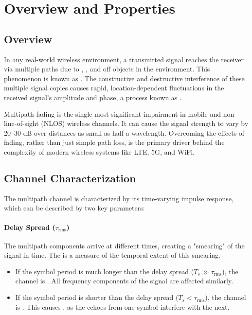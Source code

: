 \section{Overview and Properties}

\subsection{Overview}

In any real-world wireless environment, a transmitted signal reaches the receiver via multiple paths due to , , and  off objects in the environment. This phenomenon is known as . The constructive and destructive interference of these multiple signal copies causes rapid, location-dependent fluctuations in the received signal's amplitude and phase, a process known as .

\begin{keyconcept}
    Multipath fading is the single most significant impairment in mobile and non-line-of-sight (NLOS) wireless channels. It can cause the signal strength to vary by 20--30 dB over distances as small as half a wavelength. Overcoming the effects of fading, rather than just simple path loss, is the primary driver behind the complexity of modern wireless systems like LTE, 5G, and WiFi.
\end{keyconcept}


\subsection{Channel Characterization}

The multipath channel is characterized by its time-varying impulse response, which can be described by two key parameters:

\paragraph{Delay Spread ($\tau_{\text{rms}}$)}
The multipath components arrive at different times, creating a "smearing" of the signal in time. The  is a measure of the temporal extent of this smearing.
\begin{itemize}
    \item If the symbol period is much longer than the delay spread ($T_s \gg \tau_{\text{rms}}$), the channel is . All frequency components of the signal are affected similarly.
    \item If the symbol period is shorter than the delay spread ($T_s < \tau_{\text{rms}}$), the channel is . This causes , as the echoes from one symbol interfere with the next.
\end{itemize}

